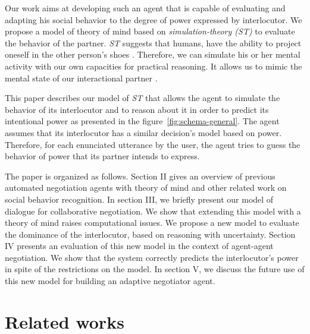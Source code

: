 \documentclass[conference, letterpaper]{IEEEtran}
\begin{document}
		Our work aims at developing such an agent that is capable of evaluating and adapting his social behavior to the degree of power expressed by interlocutor. We propose a model of theory of mind based on \emph{simulation-theory (ST)} \cite{gordon1986folk} to evaluate the behavior of the partner. \emph{ST} suggests that humans, have the ability to project oneself in the other person’s shoes \cite{shanton2010simulation}. Therefore, we can simulate his or her mental activity with our own capacities for practical reasoning. It allows us to mimic the mental state of our interactional partner \cite{harbers2009modeling}.%
		  
		 This paper describes our model of \emph{ST} that allows the agent to simulate the behavior of its interlocutor and to reason about it in order to predict its intentional power as presented in the figure~\ref{fig:schema-general}. The agent assumes that its interlocutor has a similar decision's model based on power. Therefore, for each enunciated utterance by the user, the agent tries to guess the behavior of power that its partner intends to express. 

		The paper is organized as follows. Section II gives an overview of previous automated negotiation agents with theory of mind and other related work on social behavior recognition. In section III, we briefly present our model of dialogue for collaborative negotiation. We show that extending this model with a theory of mind raises computational issues. We propose a new model to evaluate the dominance of the interlocutor, based on reasoning with uncertainty. Section IV presents an evaluation of this new model in the context of agent-agent negotiation. We show that the system correctly predicts the interlocutor's power in spite of the restrictions on the model. In section V, we discuss the future use of this new model for building an adaptive negotiator agent.
	
	
	\section{Related works}
	
\end{document}
